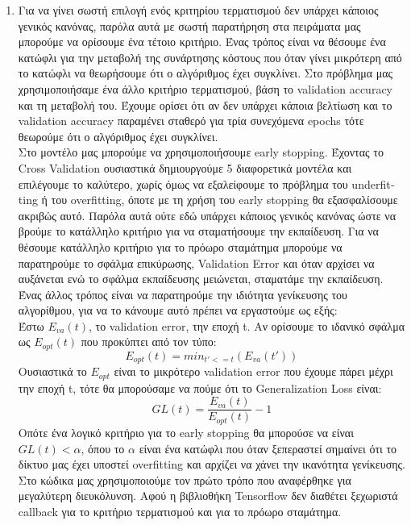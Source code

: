 \documentclass[12pt,a4paper]{article}
\newcommand{\tl}{\textlatin}
\begin{document}
\begin{enumerate}[a]
        \item Για να γίνει σωστή επιλογή ενός κριτηρίου τερματισμού δεν υπάρχει κάποιος γενικός κανόνας, παρόλα αυτά με σωστή παρατήρηση στα πειράματα μας μπορούμε να ορίσουμε ένα τέτοιο κριτήριο. Ένας τρόπος είναι να θέσουμε ένα κατώφλι για την μεταβολή της συνάρτησης κόστους που όταν γίνει μικρότερη από το κατώφλι να θεωρήσουμε ότι ο αλγόριθμος έχει συγκλίνει. Στο πρόβλημα μας χρησιμοποιήσαμε ένα άλλο κριτήριο τερματισμού, βάση το \tl{validation accuracy}  και τη μεταβολή του. Έχουμε ορίσει ότι αν δεν υπάρχει κάποια βελτίωση και το \tl{validation accuracy} παραμένει σταθερό για τρία συνεχόμενα \tl{epochs} τότε θεωρούμε ότι ο αλγόριθμος έχει συγκλίνει. \\ 
        Στο μοντέλο μας μπορούμε να χρησιμοποιήσουμε \tl{early stopping}. Έχοντας το \tl{Cross Validation} ουσιαστικά δημιουργούμε 5 διαφορετικά μοντέλα και επιλέγουμε το καλύτερο, χωρίς όμως να εξαλείφουμε το πρόβλημα του \tl{underfitting} ή του \tl{overfitting}, όποτε με τη χρήση του \tl{early stopping} θα εξασφαλίσουμε ακριβώς αυτό. Παρόλα αυτά ούτε εδώ υπάρχει κάποιος γενικός κανόνας ώστε να βρούμε το κατάλληλο κριτήριο για να σταματήσουμε την εκπαίδευση. Για να θέσουμε κατάλληλο κριτήριο για το πρόωρο σταμάτημα μπορούμε να παρατηρούμε το σφάλμα επικύρωσης, \tl{Validation Error} και όταν αρχίσει να αυξάνεται ενώ το σφάλμα εκπαίδευσης μειώνεται, σταματάμε την εκπαίδευση. Ένας άλλος τρόπος είναι
        να παρατηρούμε την ιδιότητα γενίκευσης του αλγορίθμου,  για να το κάνουμε αυτό πρέπει να εργαστούμε ως εξής: \\ 
        Έστω \tl{$E_{va}(t)$}, το \tl{validation error}, την εποχή \tl{t}. 
        Αν ορίσουμε το ιδανικό σφάλμα ως \tl{$E_{opt}(t)$} που προκύπτει από τον τύπο:
        \begin{equation}
           E_{opt}(t) = min_{t'<=t}(E_{va}(t'))
        \end{equation}
        Ουσιαστικά το \tl{$E_{opt}$} είναι το μικρότερο \tl{validation error} που έχουμε πάρει μέχρι την εποχή \tl{t}, τότε θα μπορούσαμε να πούμε ότι το \tl{Generalization Loss} είναι:
        \begin{equation}
           GL(t)=\frac{E_{va}(t)}{E_{opt}(t)} - 1
        \end{equation}
        Οπότε ένα λογικό κριτήριο για το \tl{early stopping} θα μπορούσε να είναι \tl{$GL(t) < \alpha$}, όπου το $\alpha$ είναι ένα κατώφλι που όταν ξεπεραστεί σημαίνει ότι το δίκτυο μας έχει υποστεί \tl{overfitting} και αρχίζει να χάνει την ικανότητα γενίκευσης. 
        Στο κώδικα μας χρησιμοποιούμε τον πρώτο τρόπο που αναφέρθηκε για μεγαλύτερη διευκόλυνση. Αφού η βιβλιοθήκη \tl{Tensorflow} δεν διαθέτει ξεχωριστά \tl{callback} για το κριτήριο τερματισμού και για το πρόωρο σταμάτημα.

    \end{enumerate}
\end{document}
